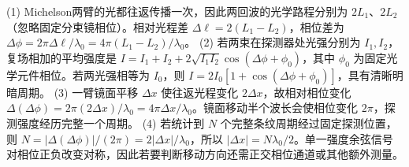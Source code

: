(1) Michelson两臂的光都往返传播一次，因此两回波的光学路程分别为 \(2L_1\)、\(2L_2\)（忽略固定分束镜相位）。相对光程差 \(\Delta\ell=2(L_1-L_2)\)，相位差为 \(\Delta\phi=2\pi\Delta\ell/\lambda_0=4\pi(L_1-L_2)/\lambda_0\)。
(2) 若两束在探测器处光强分别为 \(I_1,I_2\)，复场相加的平均强度是 \(I=I_1+I_2+2\sqrt{I_1I_2}\cos(\Delta\phi+\phi_0)\)，其中 \(\phi_0\) 为固定光学元件相位。若两光强相等为 \(I_0\)，则 \(I=2I_0[1+\cos(\Delta\phi+\phi_0)]\)，具有清晰明暗周期。
(3) 一臂镜面平移 \(\Delta x\) 使往返光程变化 \(2\Delta x\)，故相对相位变化 \(\Delta(\Delta\phi)=2\pi(2\Delta x)/\lambda_0=4\pi\Delta x/\lambda_0\)。镜面移动半个波长会使相位变化 \(2\pi\)，探测强度经历完整一个周期。
(4) 若统计到 \(N\) 个完整条纹周期经过固定探测位置，则 \(N=|\Delta(\Delta\phi)|/(2\pi)=2|\Delta x|/\lambda_0\)，所以 \(|\Delta x|=N\lambda_0/2\)。单一强度余弦信号对相位正负改变对称，因此若要判断移动方向还需正交相位通道或其他额外测量。
